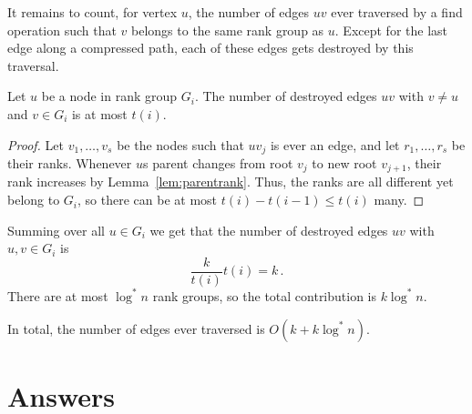 \documentclass{tstextbook}
\begin{document}
It remains to count, for vertex $u$, the number of edges $uv$ ever traversed by a find operation such that $v$ belongs to the same rank group as $u$.
Except for the last edge along a compressed path, each of these edges gets destroyed by this traversal.

\begin{lemma}
  Let $u$ be a node in rank group $G_i$.
  The number of destroyed edges $uv$ with $v\neq u$ and $v\in G_i$ is at most $t(i)$.
\end{lemma}
\begin{proof}
  Let $v_1,\ldots, v_s$ be the nodes such that $uv_j$ is ever an edge, and let $r_1, \ldots, r_s$ be their ranks.
  Whenever $u$s parent changes from root $v_j$ to new root $v_{j+1}$, their rank increases by Lemma~\ref{lem:parentrank}.
  Thus, the ranks are all different yet belong to $G_i$, so there can be at most $t(i)-t(i-1)\leq t(i)$ many.
\end{proof}

Summing over all $u\in G_i$ we get that the number of destroyed edges $uv$ with $u,v\in G_i$ is
\[ \frac{k}{t(i)}t(i) =k\,. \]
There are at most $\log^*n$ rank groups, so the total contribution is $k\log^*n$.

In total, the number of edges ever traversed is $O(k + k\log^* n)$.

\appendix
\chapter{Answers}

\shipoutAnswer
\end{document}
